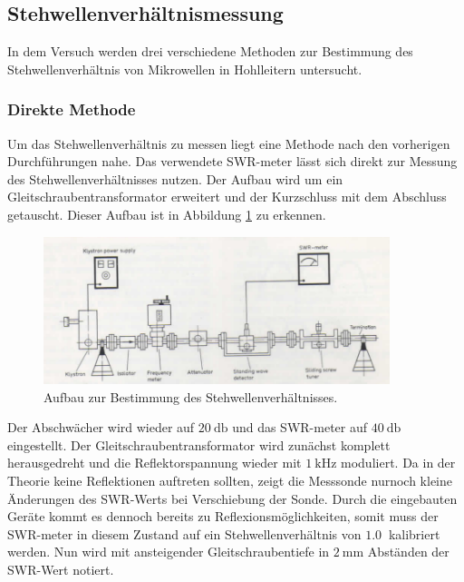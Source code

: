 \subsection{Stehwellenverhältnismessung}
In dem Versuch werden drei verschiedene Methoden zur Bestimmung des Stehwellenverhältnis von Mikrowellen in Hohlleitern untersucht.

\subsubsection{Direkte Methode}
Um das Stehwellenverhältnis zu messen liegt eine Methode nach den vorherigen Durchführungen nahe. Das verwendete SWR-meter lässt sich direkt zur Messung des Stehwellenverhältnisses nutzen. Der Aufbau wird um ein Gleitschraubentransformator erweitert
und der Kurzschluss mit dem Abschluss getauscht. Dieser Aufbau ist in Abbildung \ref{fig:3} zu erkennen. 

\begin{figure}
    \centering
    \includegraphics[width=0.9\textwidth]{bilder/aufbau3.png}
    \caption{Aufbau zur Bestimmung des Stehwellenverhältnisses. \cite{skript}} 
    \label{fig:3}
\end{figure}
Der Abschwächer wird wieder auf $\SI{20}{\decibel}$ und das SWR-meter auf $\SI{40}{\decibel}$ eingestellt. Der Gleitschraubentransformator wird zunächst komplett herausgedreht und die Reflektorspannung wieder mit $\SI{1}{\kilo\hertz}$ moduliert.
Da in der Theorie keine Reflektionen auftreten sollten, zeigt die Messsonde nurnoch kleine Änderungen des SWR-Werts bei Verschiebung der Sonde. Durch die eingebauten Geräte kommt es dennoch bereits zu Reflexionsmöglichkeiten, somit muss 
der SWR-meter in diesem Zustand auf ein Stehwellenverhältnis von $\SI{1.0}{}$ kalibriert werden. Nun wird mit ansteigender Gleitschraubentiefe in $\SI{2}{\milli\meter}$ Abständen der SWR-Wert notiert.

